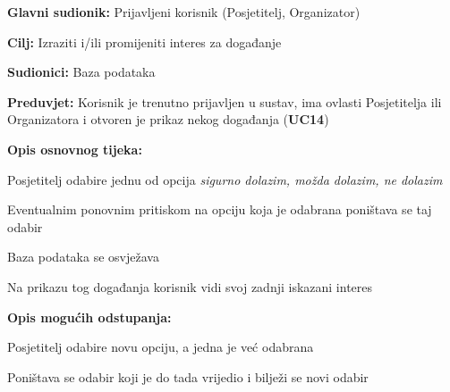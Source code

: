 	
	
	\noindent {}
	\begin{packed_item}
		
		\item \textbf{Glavni sudionik:} Prijavljeni korisnik (Posjetitelj, Organizator)
		\item  \textbf{Cilj:} Izraziti i/ili promijeniti interes za događanje
		\item  \textbf{Sudionici:} Baza podataka
		\item  \textbf{Preduvjet:} Korisnik je trenutno prijavljen u sustav, ima ovlasti Posjetitelja ili Organizatora i otvoren je  prikaz nekog događanja (\textbf{UC14})
		\item  \textbf{Opis osnovnog tijeka:}
		
		\item[] \begin{packed_enum}
			
			\item Posjetitelj odabire jednu od opcija \textit{sigurno dolazim, možda dolazim, ne dolazim }
			\item Eventualnim ponovnim pritiskom na opciju koja je odabrana poništava se taj odabir
			\item Baza podataka se osvježava
			\item Na prikazu tog događanja korisnik vidi svoj zadnji iskazani interes 
			
		\end{packed_enum}
		
		\item  \textbf{Opis mogućih odstupanja:}
		
		\item[] \begin{packed_item}
			
			\item[1.a] Posjetitelj odabire novu opciju, a jedna je već odabrana  
			\item[] \begin{packed_enum}
				
				\item Poništava se odabir koji je do tada vrijedio i bilježi se novi odabir
				
			\end{packed_enum}		
		\end{packed_item}
		
	\end{packed_item}
	
